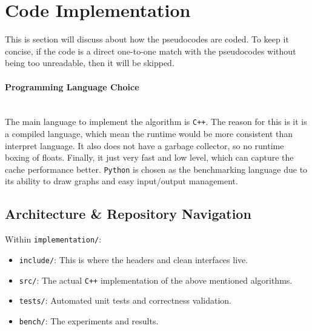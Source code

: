 \documentclass{article}
\begin{document}
\section{Code Implementation} \label{sec:im}
This is section will discuss about how the pseudocodes are coded. To keep it concise, if the code is a direct one-to-one match with the pseudocodes without being too unreadable, then it will be skipped.
\paragraph{Programming Language Choice}~{}\\ 
The main language to implement the algorithm is \texttt{C++}. The reason for this is it is a compiled language, which mean the runtime would be more consistent than interpret language. It also does not have a garbage collector, so no runtime boxing of floats. Finally, it just very fast and low level, which can capture the cache performance better. \texttt{Python} is chosen as the benchmarking language due to its ability to draw graphs and easy input/output management.

\subsection{Architecture \& Repository Navigation }
Within \texttt{implementation/}:
\begin{itemize}
  \item \texttt{include/}: This is where the headers and clean interfaces live.
  \item \texttt{src/}: The actual \texttt{C++} implementation of the above mentioned algorithms.
  \item \texttt{tests/}: Automated unit tests and correctness validation.
  \item \texttt{bench/}: The experiments and results.
\end{itemize}
\end{document}
